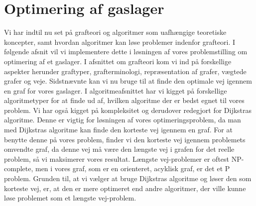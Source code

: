 \chapter{Optimering af gaslager}
Vi har indtil nu set på grafteori og algoritmer som  uafhængige teoretiske koncepter, samt hvordan algoritmer kan løse problemer indenfor grafteori. I følgende afsnit vil vi implementere dette i løsningen af vores problemstilling om optimering af et gaslager. I afsnittet om grafteori kom vi ind på forskellige aspekter herunder graftyper, grafterminologi, repræsentation af grafer, vægtede grafer og veje. Sidstnævnte kan vi nu bruge til at finde den optimale vej igennem en graf for vores gaslager. I algoritmeafsnittet har vi kigget på forskellige algoritmetyper for at finde ud af, hvilken algoritme der er bedst egnet til vores problem. Vi har også kigget på kompleksitet og derudover redegjort for Dijkstras algoritme. Denne er vigtig for løsningen af vores optimeringsproblem, da man med Dijkstras algoritme kan finde den korteste vej igennem en graf. For at benytte denne på vores problem, finder vi den korteste vej igennem problemets omvendte graf, da denne vej må være den længste vej i grafen for det reelle problem, så vi maksimerer vores resultat. Længste vej-problemer er oftest NP-complete, men i vores graf, som er en orienteret, acyklisk graf, er det et P problem. Grunden til, at vi vælger at bruge Dijkstras algoritme og løser den som korteste vej, er, at den er mere optimeret end andre algoritmer, der ville kunne løse problemet som et længste vej-problem.



















